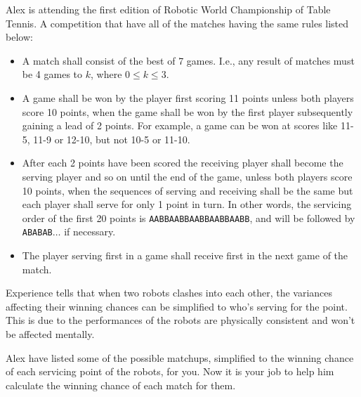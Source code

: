 Alex is attending the first edition of Robotic World Championship of Table 
Tennis. 
A competition that have all of the matches having the same rules listed below:

\begin{itemize}
\tightlist
\item A match shall consist of the best of 7 games.
      I.e., any result of matches must be 4 games to $k$, 
      where $0 \leq k \leq 3$.
\item A game shall be won by the player first scoring 11 points unless both 
      players score 10 points, when the game shall be won by the first player 
      subsequently gaining a lead of 2 points.
      For example, a game can be won at scores like 11-5, 11-9 or 12-10, 
      but not 10-5 or 11-10.
\item After each 2 points have been scored the receiving player shall become 
      the serving player and so on until the end of the game, unless both 
      players score 10 points, when the sequences of serving and receiving 
      shall be the same but each player shall serve for only 1 point in turn. 
      In other words, the servicing order of the first 20 points is 
      \verb+AABBAABBAABBAABBAABB+, and will be followed by \verb+ABABAB+$\ldots$
      if necessary.
\item The player serving first in a game shall receive first in the next game 
      of the match.
\end{itemize}

Experience tells that when two robots clashes into each other, 
the variances affecting their winning chances can be simplified to 
who's serving for the point. This is due to the performances of the 
robots are physically consistent and won't be affected mentally.

Alex have listed some of the possible matchups, simplified to the winning 
chance of each servicing point of the robots, for you. Now it is your job to 
help him calculate the winning chance of each match for them.
